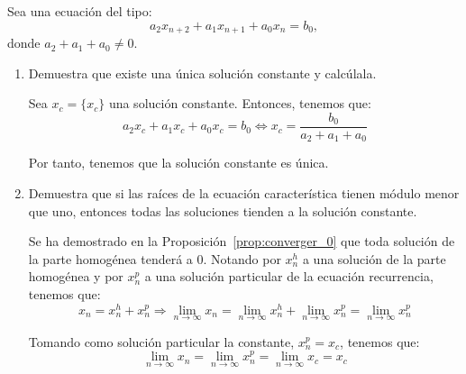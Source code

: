 \begin{ejercicio}
    Sea una ecuación del tipo:
    \begin{equation*}
        a_2 x_{n+2} + a_1 x_{n+1} + a_0 x_n = b_0,
    \end{equation*}
    donde $a_2 + a_1 + a_0 \neq 0$.
    \begin{enumerate}
        \item Demuestra que existe una única solución constante y calcúlala.

        Sea $x_c=\{x_c\}$ una solución constante. Entonces, tenemos que:
        \begin{equation*}
            a_2x_c+a_1x_c+a_0x_c=b_0 \Longleftrightarrow
            x_c = \dfrac{b_0}{a_2+a_1+a_0}
        \end{equation*}

        Por tanto, tenemos que la solución constante es única.
        
        \item Demuestra que si las raíces de la ecuación característica tienen módulo menor que uno, entonces todas las soluciones tienden a la solución constante.

        Se ha demostrado en la Proposición~\ref{prop:converger_0} que toda solución de la parte homogénea tenderá a $0$. Notando por $x_n^{h}$ a una solución de la parte homogénea y por $x_n^{p}$ a una solución particular de la ecuación recurrencia, tenemos que:
        \begin{equation*}
            x_n = x_n^{h} + x_n^{p}
            \Longrightarrow
            \lim_{n\to \infty}x_n = 
            \lim_{n\to \infty}x_n^{h} + \lim_{n\to \infty}x_n^{p}
            = \lim_{n\to \infty}x_n^{p}
        \end{equation*}

        Tomando como solución particular la constante, $x_n^p=x_c$, tenemos que:
        \begin{equation*}
            \lim_{n\to \infty}x_n = \lim_{n\to \infty}x_n^{p}
            = \lim_{n\to \infty}x_c = x_c
        \end{equation*}
    \end{enumerate}
\end{ejercicio}


